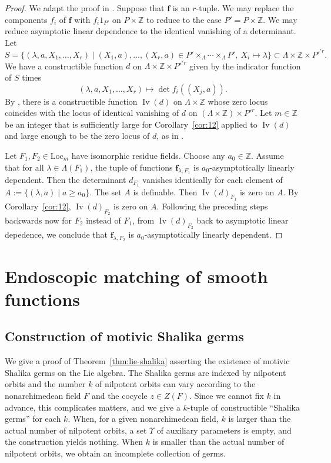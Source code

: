 \documentclass[12pt]{amsart}
\newcommand{\op}[1]{\operatorname{#1}}
\newcommand{\ring}[1]{{\mathbb #1}}
\newcommand{\locus}[1]{\op{Iv}(#1)}
\def\Y{\Upsilon}
\def\bf{\mathbf f}
\newcommand{\Loc}{\mathrm{Loc}}
\theoremstyle{plain}
\theoremstyle{definition}
\begin{document}
\begin{proof} We adapt the proof in \cite{CGH2}. Suppose that $\bf$ is
  an $r$-tuple.  We may replace the components $f_i$ of $\bf$ with
  $f_i 1_{P'}$ on $P\times\ring{Z}$ to reduce to the case
  $P'=P\times\ring{Z}$.  We may reduce asymptotic linear dependence to
  the identical vanishing of a determinant.  Let
\[
S = \{(\lambda,a,X_1,\ldots,X_r)\mid (X_1,a),\ldots,(X_r,a)\in P'\times_\Lambda
\cdots\times_\Lambda 
P',~X_i\mapsto \lambda\} \subset \Lambda\times\ring{Z}\times P'^{'r}.
\]
We have a constructible function $d$ on $\Lambda\times\ring{Z}\times P'^{'r}$
given by the indicator function of $S$ times
\[
(\lambda,a,X_1,\ldots,X_r)\mapsto 
\det f_i((X_j,a)).
\]
By \cite{CGH1}, there is a constructible function $\locus{d}$ on
$\Lambda\times\ring{Z}$ whose zero locus coincides with the locus of
identical vanishing of $d$ on $(\Lambda\times\ring{Z})\times P'^r$.
Let $m\in\ring{Z}$ be an integer that is sufficiently large for
Corollary~\ref{cor:12} applied to $\locus{d}$ and large enough to be
the zero locus of $d$, as in \cite{CGH1}.

Let $F_1,F_2\in\Loc_m$ have isomorphic residue fields.  Choose any
$a_0\in\ring{Z}$.  Assume that for all $\lambda\in \Lambda(F_1)$, the
tuple of functions $\bf_{\lambda,F_1}$ is $a_0$-asymptotically
linearly dependent.  Then the determinant $d_{F_1}$ vanishes identically for each
element of $A:=\{(\lambda,a)\mid a\ge a_0\}$.  The set $A$ is
definable.  Then $\locus{d}_{F_1}$ is zero on $A$.  By
Corollary~\ref{cor:12}, $\locus{d}_{F_2}$ is zero on $A$.  Following
the preceding steps backwards now for $F_2$ instead of $F_1$, from
$\locus{d}_{F_2}$ back to asymptotic linear depedence, we conclude
that $\bf_{\lambda,F_2}$ is $a_0$-asymptotically linearly dependent.
\end{proof}



\section{Endoscopic matching of smooth functions}


\subsection{Construction of motivic Shalika germs}\label{sec:msg}

We give a proof of Theorem~\ref{thm:lie-shalika} asserting the
existence of motivic Shalika germs on the Lie algebra.  The Shalika
germs are indexed by nilpotent orbits and the number $k$ of nilpotent
orbits can vary according to the nonarchimedean field $F$ and the
cocycle $z\in Z(F)$.  Since we cannot fix $k$ in advance, this
complicates matters, and we give a $k$-tuple of constructible
``Shalika germs'' for each $k$.  When, for a given nonarchimedean
field, $k$ is larger than the actual number of nilpotent orbits, a
set $\Y$ of auxiliary parameters is empty, and the construction yields
nothing.  When $k$ is smaller than the actual number of nilpotent
orbits, we obtain an incomplete collection of germs.
\end{document}
